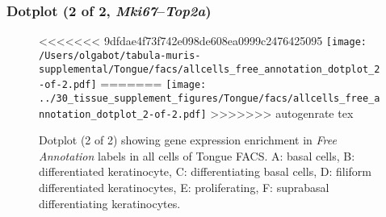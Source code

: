 \subsubsection{Dotplot (2 of 2, \emph{Mki67}--\emph{Top2a})}
\begin{figure}[h]
\centering
<<<<<<< 9dfdae4f73f742e098de608ea0999c2476425095
\texttt{[image: /Users/olgabot/tabula-muris-supplemental/Tongue/facs/allcells\_free\_annotation\_dotplot\_2-of-2.pdf]}
=======
\texttt{[image: ../30\_tissue\_supplement\_figures/Tongue/facs/allcells\_free\_annotation\_dotplot\_2-of-2.pdf]}
>>>>>>> autogenrate tex

\caption{ Dotplot (2 of 2)  showing gene expression enrichment in \emph{Free Annotation} labels in all cells of Tongue FACS. A: basal cells, B: differentiated keratinocyte, C: differentiating basal cells, D: filiform differentiated keratinocytes, E: proliferating, F: suprabasal differentiating keratinocytes.}
\end{figure}

